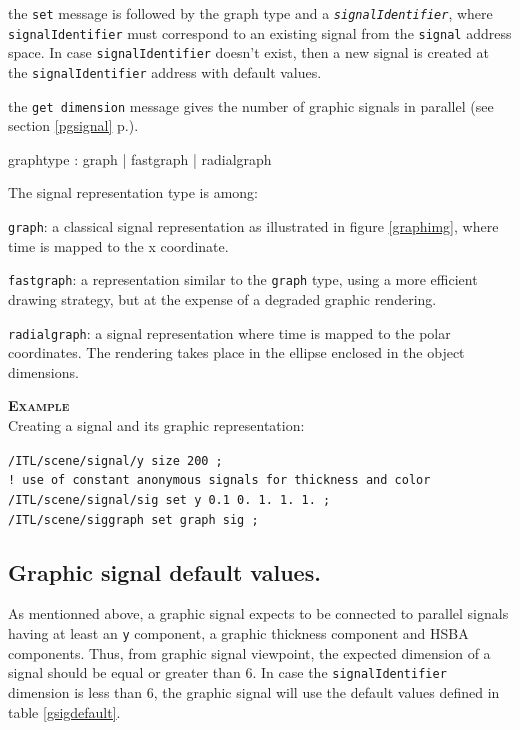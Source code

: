 \documentclass[a4paper,twoside]{report}
\newcommand{\subsublevel}[1]	{\subsection{#1}}
\newcommand{\fullref}[1]	{\ref{#1} p.\pageref{#1}}
\newcommand{\OSC}[1]		{\texttt{#1}}
\newcommand{\values}[1]		{\texttt{#1}}
\newcommand{\example}		{\textbf{\hspace{-1.5cm}\textbf{\textsc{Example }}}}
\let\olditemize\itemize
\let\oldenditemize\enditemize
\renewenvironment{itemize} 	{\olditemize \setlength{\itemsep}{1mm}}{\oldenditemize}
\newcommand{\sample}	[1]			{\vspace{-2mm}\begin{center}\colorbox{mygrey}{
								\begin{minipage}[t]{0.9\columnwidth} 
								{\small \texttt{#1}}
								\end{minipage}}\end{center}}
\begin{document}
\begin{itemize}
\item the \OSC{set} message is followed by the graph type and a \OSC{\textit{signalIdentifier}}, where \OSC{signalIdentifier} must correspond to an existing signal from the \OSC{signal} address space. In case \OSC{signalIdentifier} doesn't exist, then a new signal is created at the \OSC{signalIdentifier} address with default values. 
\item the \OSC{get dimension} message gives the number of graphic signals in parallel (see section \fullref{pgsignal}). 
 \end{itemize}
 
\begin{rail}
graphtype : graph
			| fastgraph
			| radialgraph
\end{rail}

The signal representation type is among:
\begin{itemize}
\item \OSC{graph}: a classical signal representation as illustrated in figure \ref{graphimg}, where time is mapped to the x coordinate. 
\item \OSC{fastgraph}: a representation similar to the \OSC{graph} type, using a more efficient drawing strategy, but at the expense of a degraded graphic rendering. 
\item \OSC{radialgraph}: a signal representation where time is mapped to the polar coordinates. The rendering takes place in the ellipse enclosed in the object dimensions.
\end{itemize}

\example \\
Creating a signal and its graphic representation:
\sample{/ITL/scene/signal/y size 200 ; \\
! use of constant anonymous signals for thickness and color\\
/ITL/scene/signal/sig set y 0.1 0. 1. 1. 1. ; \\
/ITL/scene/siggraph set graph sig ;
}

\subsublevel{Graphic signal default values.}
As mentionned above, a graphic signal expects to be connected to parallel signals having at least an \values{y} component, a graphic thickness component and HSBA components. Thus, from graphic signal viewpoint, the expected dimension of a signal should be equal or greater than 6. In case the \OSC{signalIdentifier} dimension is less than 6, the graphic signal will use the default values defined in table \ref{gsigdefault}.
\end{document}
